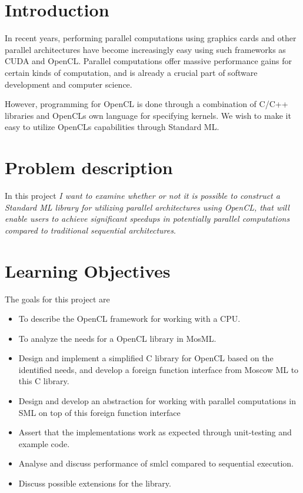 \documentclass[a4paper, 10pt]{article}
\begin{document}
\maketitle

\newpage

\tableofcontents

\newpage

\section{Introduction}

In recent years, performing parallel computations using graphics cards
and other parallel architectures have become increasingly easy using
such frameworks as CUDA and OpenCL. Parallel computations offer
massive performance gains for certain kinds of computation, and is
already a crucial part of software development and computer science.

However, programming for OpenCL is done through a combination of C/C++
libraries and OpenCLs own language for specifying kernels. We wish to
make it easy to utilize OpenCLs capabilities through Standard ML.

\section{Problem description}

In this project \emph{I want to examine whether or not it is possible
  to construct a Standard ML library for utilizing parallel
  architectures using OpenCL, that will enable users to achieve
  significant speedups in potentially parallel computations compared
  to traditional sequential architectures}.

\section{Learning Objectives}

The goals for this project are

\begin{itemize}
  \item To describe the OpenCL framework for working with a CPU.
  \item To analyze the needs for a OpenCL library in MosML.
  \item Design and implement a simplified C library for OpenCL based
    on the identified needs, and develop a foreign function interface
    from Moscow ML to this C library.
  \item Design and develop an abstraction for working with parallel
    computations in SML on top of this foreign function interface
  \item Assert that the implementations work as expected through
    unit-testing and example code.
  \item Analyse and discuss performance of smlcl compared to
    sequential execution.
  \item Discuss possible extensions for the library.
\end{itemize}
\end{document}
